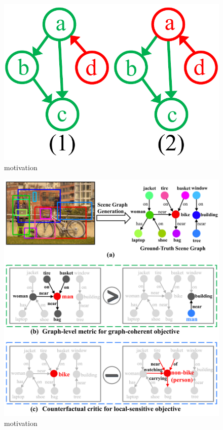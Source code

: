 \begin{figure}[htbp]
    \centering
    \includegraphics[width=\linewidth]{chapter4/res/local_sensitive.pdf}
    \caption{motivation}
    \label{xx}
\end{figure}

\begin{figure}[htbp]
    \centering
    \includegraphics[width=\linewidth]{chapter4/res/motivation.pdf}
    \caption{motivation}
    \label{xx}
\end{figure}

